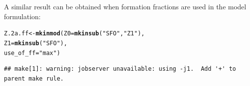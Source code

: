 \documentclass[12pt,a4paper]{article}\usepackage[]{graphicx}\usepackage[]{color}
\makeatletter
\newcommand{\hlstr}[1]{\textcolor[rgb]{0.192,0.494,0.8}{#1}}%
\newcommand{\hlstd}[1]{\textcolor[rgb]{0.345,0.345,0.345}{#1}}%
\newcommand{\hlkwb}[1]{\textcolor[rgb]{0.69,0.353,0.396}{#1}}%
\newcommand{\hlkwc}[1]{\textcolor[rgb]{0.333,0.667,0.333}{#1}}%
\newcommand{\hlkwd}[1]{\textcolor[rgb]{0.737,0.353,0.396}{\textbf{#1}}}%
\newenvironment{kframe}{%
 \def\at@end@of@kframe{}%
 \ifinner\ifhmode%
  \def\at@end@of@kframe{\end{minipage}}%
  \begin{minipage}{\columnwidth}%
 \fi\fi%
 \def\FrameCommand##1{\hskip\@totalleftmargin \hskip-\fboxsep
 \colorbox{shadecolor}{##1}\hskip-\fboxsep
     \hskip-\linewidth \hskip-\@totalleftmargin \hskip\columnwidth}%
 \MakeFramed {\advance\hsize-\width
   \@totalleftmargin\z@ \linewidth\hsize
   \@setminipage}}%
 {\par\unskip\endMakeFramed%
 \at@end@of@kframe}
\newenvironment{knitrout}{}{} %
\makeatother
\begin{document}
A similar result can be obtained when formation fractions are used in the model 
formulation:

\begin{knitrout}
\color{fgcolor}\begin{kframe}
\begin{alltt}
\hlstd{Z.2a.ff} \hlkwb{<-} \hlkwd{mkinmod}\hlstd{(}\hlkwc{Z0} \hlstd{=} \hlkwd{mkinsub}\hlstd{(}\hlstr{"SFO"}\hlstd{,} \hlstr{"Z1"}\hlstd{),}
                   \hlkwc{Z1} \hlstd{=} \hlkwd{mkinsub}\hlstd{(}\hlstr{"SFO"}\hlstd{),}
                   \hlkwc{use_of_ff} \hlstd{=} \hlstr{"max"}\hlstd{)}
\end{alltt}
\begin{verbatim}
## make[1]: warning: jobserver unavailable: using -j1.  Add '+' to parent make rule.
\end{verbatim}



\end{kframe}
\end{knitrout}
\end{document}
